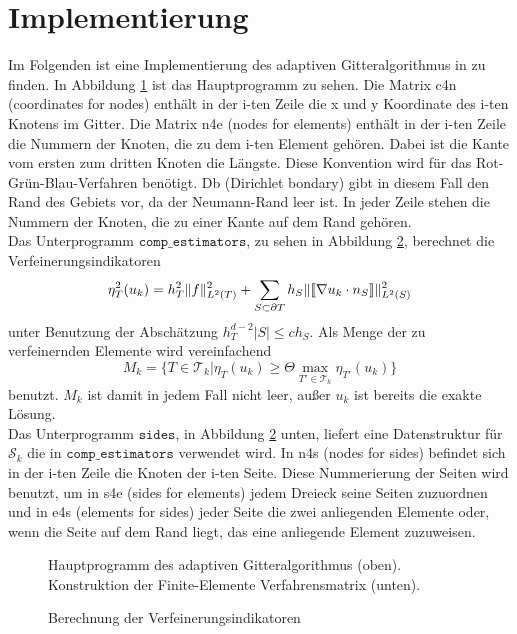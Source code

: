 \section{Implementierung}
Im Folgenden ist eine Implementierung des adaptiven Gitteralgorithmus in \matlab \: zu finden. In Abbildung \ref{main} ist das Hauptprogramm zu sehen. Die Matrix c4n (coordinates for nodes) enthält in der i-ten Zeile die x und y Koordinate des i-ten Knotens im Gitter. Die Matrix n4e (nodes for elements) enthält in der i-ten Zeile die Nummern der Knoten, die zu dem i-ten Element gehören. Dabei ist die Kante vom ersten zum dritten Knoten die Längste. Diese Konvention wird für das Rot-Grün-Blau-Verfahren benötigt. Db (Dirichlet bondary) gibt in diesem Fall den Rand des Gebiets vor, da der Neumann-Rand leer ist. In jeder Zeile stehen die Nummern der Knoten, die zu einer Kante auf dem Rand gehören. \\
Das Unterprogramm $\texttt{comp\_estimators}$, zu sehen in Abbildung \ref{indi}, berechnet die Verfeinerungsindikatoren
\[
\eta^2_T(u_k) = h^2_T\|f\|^2_{L^2(T)} + \sum_{S\subset\partial T} h_S\|\llbracket \nabla u_k \cdot n_S\rrbracket\|^2_{L^2(S)} 
\]
unter Benutzung der Abschätzung $h_T^{d-2}|S| \leq ch_S$.
Als Menge der zu verfeinernden Elemente wird vereinfachend
\[
M_k = \{T\in\mathscr{T}_k | \eta_T(u_k)\geq \Theta \max_{T'\in \mathscr{T}_k} \eta_{T'}(u_k)\}
\]
benutzt. $M_k$ ist damit in jedem Fall nicht leer, außer $u_k$ ist bereits die exakte Lösung. \\
Das Unterprogramm $\texttt{sides}$, in Abbildung \ref{indi} unten, liefert eine Datenstruktur für $\mathscr{S}_k$ die in $\texttt{comp\_estimators}$ verwendet wird. In n4s (nodes for sides) befindet sich in der i-ten Zeile die Knoten der i-ten Seite. Diese Nummerierung der Seiten wird benutzt, um in s4e (sides for elements) jedem Dreieck seine Seiten zuzuordnen und in e4s (elements for sides) jeder Seite die zwei anliegenden Elemente oder, wenn die Seite auf dem Rand liegt, das eine anliegende Element zuzuweisen.

\begin{figure}[!htbp]
	
	\caption{ \label{main}Hauptprogramm des adaptiven Gitteralgorithmus (oben). Konstruktion der Finite-Elemente Verfahrensmatrix (unten).}
\end{figure}
\begin{figure}[!htbp]
	
	\caption{\label{indi}Berechnung der Verfeinerungsindikatoren}
\end{figure}

